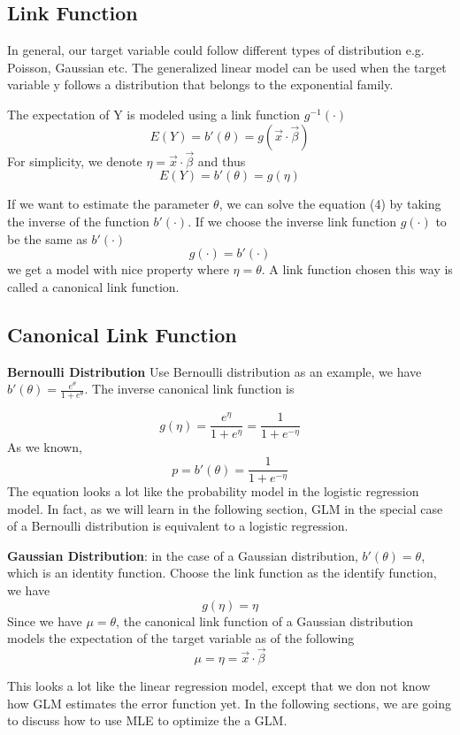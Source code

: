 \documentclass[12pt, oneside]{article}
\begin{document}
\subsection{Link Function}
In general, our target variable could follow different types of distribution e.g. Poisson, Gaussian etc. The generalized linear model can be used when the target variable y follows a distribution that belongs to the exponential family. 

The expectation of Y is modeled using a link function $g^{-1}(\cdot)$ 
$$E(Y)=b'(\theta)=g(\vec{x}\cdot\vec{\beta})$$
For simplicity, we denote $\eta=\vec{x}\cdot\vec{\beta}$ and thus 
\begin{equation}
E(Y)=b'(\theta)=g(\eta)
\end{equation}


If we want to estimate the parameter $\theta$, we can solve the equation (4) by taking the inverse of the function $b'(\cdot)$. If we choose the inverse link function $g(\cdot)$ to be the same as $b'(\cdot)$
\begin{equation}
g(\cdot)=b'(\cdot)
\end{equation}
we get a model with nice property where $\eta=\theta$. A link function chosen this way is called a canonical link function.

\subsection{Canonical Link Function}
\textbf{Bernoulli Distribution} Use Bernoulli distribution as an example, we have $b'(\theta)=\frac{e^\theta}{1+e^\theta}$. The inverse canonical link function is 

$$g(\eta)=\frac{e^{\eta}}{1+e^{\eta}}=\frac{1}{1+e^{-\eta}}$$
As we known,  $$p=b'(\theta)=\frac{1}{1+e^{-\eta}}$$ The equation looks a lot like the probability model in the logistic regression model. In fact, as we will learn in the following section, GLM in the special case of a Bernoulli distribution is equivalent to a logistic regression.

\textbf{Gaussian Distribution}: in the case of a Gaussian distribution, $b'(\theta)=\theta$, which is an identity function. Choose the link function as the identify function, we have 
$$g(\eta)=\eta$$
Since we have $\mu=\theta$, the canonical link function of a Gaussian distribution models the expectation of the target variable as of the following
$$\mu=\eta=\vec{x}\cdot\vec{\beta}$$ 

This looks a lot like the linear regression model, except that we don not know how GLM estimates the error function yet. In the following sections, we are going to discuss how to use MLE to optimize the a GLM.
\end{document}

